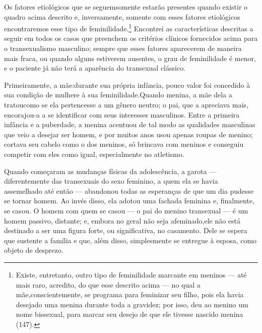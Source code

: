 Os fatores etiológicos que se seguem\idxtranseetio[|(] somente estarão presentes
quando existir o quadro acima descrito e, inversamente, somente com
esses fatores etiológicos encontraremos esse tipo de feminilidade.\footnote{ Existe,
entretanto, outro tipo de feminilidade marcante em
meninos --- até mais raro, acredito, do que esse descrito acima ---
no qual a mãe,\idxmaesdese[|nn] conscientemente, se programa para feminizar seu filho,
pois ela havia desejado uma menina durante toda a gravidez; por isso,
deu ao menino um nome bissexual, para marcar seu desejo de que ele
tivesse nascido menina (147).} Encontrei as características descritas
a seguir em todos os casos que preenchem os critérios clínicos
fornecidos acima para o transexualismo masculino; sempre que esses
fatores aparecerem de maneira mais fraca, ou quando alguns estiverem
ausentes, o grau de feminilidade é menor, e o paciente já não terá a
aparência do transexual clássico.

Primeiramente,\idxmaesbiss{} a mãe:\idxpaisfilh[|(] durante sua própria infância,\idxfeminmaes{} pouco valor foi
concedido à sua condição de mulher\idxtransesimb[|(] e à sua feminilidade.\idxmaestran[|(] Quando menina,
a mãe dela a tratou\idxmaesfilh[|(] como se ela pertencesse a um gênero neutro; o pai,
que a apreciava mais, encorajou-a a se identificar com seus interesses
masculinos. Entre a primeira infância e a puberdade, a menina acentuou
de tal modo as qualidades masculinas que veio a desejar ser homem, e
por muitos anos usou apenas roupas de menino; cortava seu cabelo como o
dos meninos, só brincava com meninos e conseguiu competir com eles como
igual, especialmente no atletismo.

Quando começaram as mudanças físicas da adolescência, a garota ---
diferentemente das transexuais do sexo feminino, a quem ela se havia
assemelhado até então --- abandonou todas as esperanças de que um dia
pudesse se tornar homem. Ao invés disso, ela adotou uma fachada
feminina e, finalmente, se casou. O homem com quem se casou --- o pai
do menino transexual --- é um homem passivo, distante; e, embora no
geral não seja afeminado,\idxhomosafem[|)] ele não está destinado a ser uma figura
forte, ou significativa, no casamento. Dele se espera que sustente a
família e que, além disso, simplesmente se entregue à esposa, como
objeto de desprezo.

